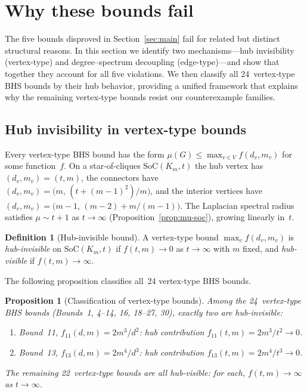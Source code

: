 \documentclass[preprint,12pt]{elsarticle}
\newtheorem{proposition}[theorem]{Proposition}
\theoremstyle{definition}
\newtheorem{definition}[theorem]{Definition}
\theoremstyle{remark}
\newcommand{\SoC}{\mathrm{SoC}}       %
\newcommand{\Lspec}{\mu}               %
\begin{document}
\section{Why these bounds fail}\label{sec:mechanism}

The five bounds disproved in Section~\ref{sec:main} fail for related but
distinct structural reasons.  In this section we identify two mechanisms---hub
invisibility (vertex-type) and degree--spectrum decoupling (edge-type)---and
show that together they account for all five violations.  We then classify all
24~vertex-type BHS bounds by their hub behavior, providing a unified framework
that explains why the remaining vertex-type bounds resist our counterexample
families.

\subsection{Hub invisibility in vertex-type bounds}\label{ssec:hub-invisible}

Every vertex-type BHS bound has the form
$\Lspec(G) \leq \max_{v \in V} f(d_v, m_v)$ for some function~$f$.
On a star-of-cliques $\SoC(K_m, t)$ the hub vertex has
$(d_v, m_v) = (t, m)$, the connectors have
$(d_v, m_v) = \bigl(m, \, (t + (m{-}1)^2)/m\bigr)$,
and the interior vertices have
$(d_v, m_v) = \bigl(m{-}1, \, (m{-}2) + m/(m{-}1)\bigr)$.
The Laplacian spectral radius satisfies $\Lspec \sim t + 1$ as
$t \to \infty$ (Proposition~\ref{prop:mu-soc}), growing linearly in~$t$.

\begin{definition}[Hub-invisible bound]\label{def:hub-invisible}
  A vertex-type bound $\max_v f(d_v,m_v)$ is
  \emph{hub-invisible} on $\SoC(K_m, t)$
  if $f(t,m) \to 0$ as $t \to \infty$ with $m$ fixed,
  and \emph{hub-visible} if $f(t,m) \to \infty$.
\end{definition}

The following proposition classifies all~24 vertex-type BHS bounds.

\begin{proposition}[Classification of vertex-type bounds]\label{prop:hub-classification}
  Among the 24~vertex-type BHS bounds (Bounds~1, 4--14, 16, 18--27, 30),
  exactly two are hub-invisible:
  \begin{enumerate}[label=\textup{(\alph*)}]
    \item Bound~11, $f_{11}(d,m) = 2m^3/d^2$: hub contribution
      $f_{11}(t,m) = 2m^3/t^2 \to 0$.
    \item Bound~13, $f_{13}(d,m) = 2m^4/d^3$: hub contribution
      $f_{13}(t,m) = 2m^4/t^3 \to 0$.
  \end{enumerate}
  The remaining 22~vertex-type bounds are all hub-visible: for each,
  $f(t,m) \to \infty$ as $t \to \infty$.
\end{proposition}
\end{document}
